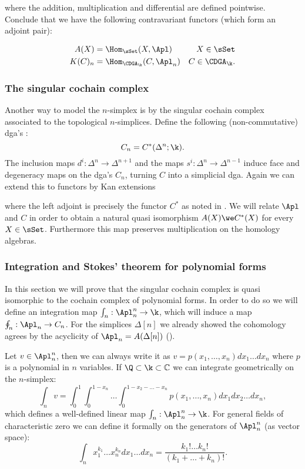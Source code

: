 where the addition, multiplication and differential are defined pointwise. Conclude that we have the following contravariant functors (which form an adjoint pair):

\begin{align*}
	A(X) &= \Hom_\sSet(X, \Apl) & X \in \sSet \\
	K(C)_n &= \Hom_{\CDGA_\k}(C, \Apl_n) & C \in \CDGA_\k.
\end{align*}


\subsubsection{The singular cochain complex}

Another way to model the $n$-simplex is by the singular cochain complex associated to the topological $n$-simplices. Define the following (non-commutative) dga's :
$$ C_n = C^\ast(\Delta^n; \k). $$
The inclusion maps $d^i : \Delta^n \to \Delta^{n+1}$ and the maps $s^i: \Delta^n \to \Delta^{n-1}$ induce face and degeneracy maps on the dga's $C_n$, turning $C$ into a simplicial dga. Again we can extend this to functors by Kan extensions


where the left adjoint is precisely the functor $C^\ast$ as noted in \cite{felix}. We will relate $\Apl$ and $C$ in order to obtain a natural quasi isomorphism $A(X) \we C^\ast(X)$ for every $X \in \sSet$. Furthermore this map preserves multiplication on the homology algebras.


\subsubsection{Integration and Stokes' theorem for polynomial forms}

In this section we will prove that the singular cochain complex is quasi isomorphic to the cochain complex of polynomial forms. In order to do so we will define an integration map $\int_n : \Apl_n^n \to \k$, which will induce a map $\oint_n : \Apl_n \to C_n$. For the simplices $\Delta[n]$ we already showed the cohomology agrees by the acyclicity of $\Apl_n = A(\Delta[n])$ ().

Let $v \in \Apl_n^n$, then we can always write it as $v = p(x_1, \dots, x_n)dx_1 \dots dx_n$ where $p$ is a polynomial in $n$ variables. If $\Q \subset \k \subset \mathbb{C}$ we can integrate geometrically on the $n$-simplex:
$$ \int_n v = \int_0^1 \int_0^{1-x_n} \dots \int_0^{1 - x_2 - \dots - x_n} p(x_1, \dots, x_n) dx_1 dx_2 \dots dx_n, $$
which defines a well-defined linear map $\int_n : \Apl_n^n \to \k$. For general fields of characteristic zero we can define it formally on the generators of $\Apl_n^n$ (as vector space):
$$ \int_n x_1^{k_1} \dots x_n^{k_n} dx_1 \dots dx_n = \frac{k_1! \dots k_n!}{(k_1 + \dots + k_n)!}. $$

